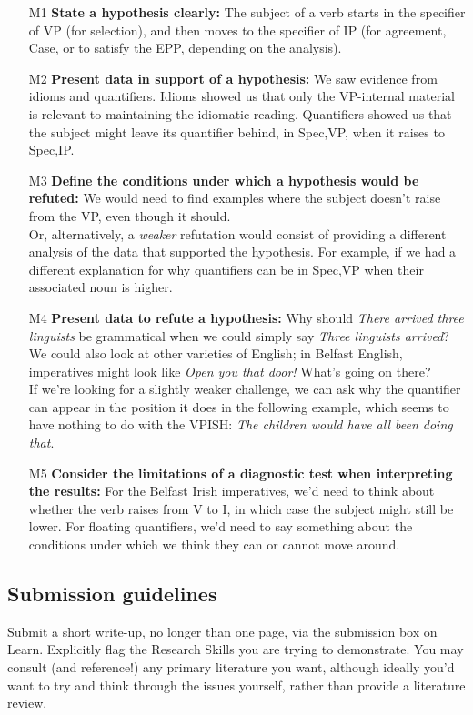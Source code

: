 \documentclass{article}
\begin{document}
\begin{itemize}
    \item[M1] \textbf{State a hypothesis clearly:} The subject of a verb starts in the specifier of VP (for selection), and then moves to the specifier of IP (for agreement, Case, or to satisfy the EPP, depending on the analysis).
    \item[M2] \textbf{Present data in support of a hypothesis:} We saw evidence from idioms and quantifiers. Idioms showed us that only the VP-internal material is relevant to maintaining the idiomatic reading. Quantifiers showed us that the subject might leave its quantifier behind, in Spec,VP, when it raises to Spec,IP.
    \item[M3] \textbf{Define the conditions under which a hypothesis would be refuted:} We would need to find examples where the subject doesn't raise from the VP, even though it should.\\
    Or, alternatively, a \emph{weaker} refutation would consist of providing a different analysis of the data that supported the hypothesis. For example, if we had a different explanation for why quantifiers can be in Spec,VP when their associated noun is higher. 
    \item[M4] \textbf{Present data to refute a hypothesis:} Why should \emph{There arrived three linguists} be grammatical when we could simply say \emph{Three linguists arrived}? We could also look at other varieties of English; in Belfast English, imperatives might look like \emph{Open you that door!} What's going on there?\\
    If we're looking for a slightly weaker challenge, we can ask why the quantifier can appear in the position it does in the following example, which seems to have nothing to do with the VPISH: \emph{The children would have all been doing that}.
    \item[M5] \textbf{Consider the limitations of a diagnostic test when interpreting the results:} For the Belfast Irish imperatives, we'd need to think about whether the verb raises from V to I, in which case the subject might still be lower. For floating quantifiers, we'd need to say something about the conditions under which we think they can or cannot move around.
\end{itemize}

    \subsection{Submission guidelines}
Submit a short write-up, no longer than one page, via the submission box on Learn. Explicitly flag the Research Skills you are trying to demonstrate. You may consult (and reference!) any primary literature you want, although ideally you'd want to try and think through the issues yourself, rather than provide a literature review.
\end{document}

